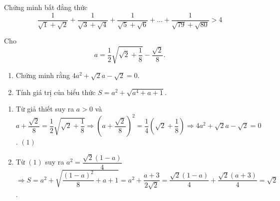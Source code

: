 \begin{bt}
	Chứng minh bất đẳng thức
	\[
	\dfrac{1}{\sqrt{1}+\sqrt{2}}+\dfrac{1}{\sqrt{3}+\sqrt{4}}+\dfrac{1}{\sqrt{5}+\sqrt{6}}+...+\dfrac{1}{\sqrt{79}+\sqrt{80}}>4
	\]
\end{bt}
\begin{bt}
	Cho 
	$$a= \dfrac{1}{2} \sqrt{\sqrt{2}+\dfrac{1}{8}}- \dfrac{\sqrt{2}}{8}.$$
	\begin{enumerate}
		\item Chứng minh rằng $4a^2 + \sqrt{2}a- \sqrt{2}= 0$.
		\item Tính giá trị của biểu thức $S= a^2 + \sqrt{a^4+ a+1}$.
	\end{enumerate}
	\loigiai
	{
		\begin{enumerate}
			\item Từ giả thiết suy ra $a>0$ và \\
			$a+ \dfrac{\sqrt{2}}{8}= \dfrac{1}{2} \sqrt{\sqrt{2}+\dfrac{1}{8}} \Rightarrow \left(a+ \dfrac{\sqrt{2}}{8}\right)^2= \dfrac{1}{4}\left(\sqrt{2}+ \dfrac{1}{8}\right)
			\Rightarrow 4a^2 + \sqrt{2}a- \sqrt{2}= 0$. $(1)$
			\item Từ $(1)$ suy ra $a^2= \dfrac{\sqrt{2}(1-a)}{4}$\\
			$\Rightarrow S= a^2+ \sqrt{\dfrac{(1-a)^2}{8}+ a +1}= a^2+ \dfrac{a+3}{2 \sqrt{2}}= \dfrac{\sqrt{2}(1-a)}{4}+ \dfrac{\sqrt{2}(a+3)}{4}= \sqrt{2}$.
		\end{enumerate}
	}
\end{bt}
